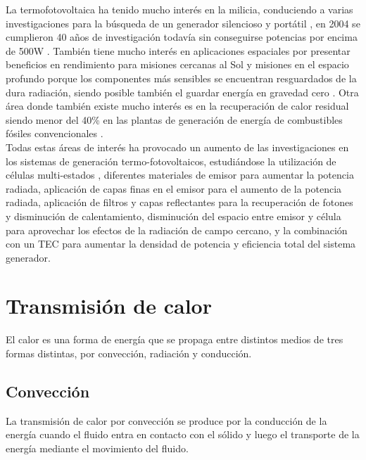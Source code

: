 La termofotovoltaica ha tenido mucho interés en la milicia, conduciendo a varias investigaciones para la búsqueda de un generador silencioso y portátil \cite{military_TPV}, en 2004 se cumplieron 40 años de investigación todavía sin conseguirse potencias por encima de 500W \cite{military_TPV_40Years}. También tiene mucho interés en aplicaciones espaciales por presentar beneficios en rendimiento para misiones cercanas al Sol y misiones en el espacio profundo porque los componentes más sensibles se encuentran resguardados de la dura radiación, siendo posible también el guardar energía en gravedad cero \cite{TPV_space_applications}. Otra área donde también existe mucho interés es en la recuperación de calor residual siendo menor del 40\% en las plantas de generación de energía de combustibles fósiles convencionales \cite{wasteHeat_TPV}.\\

Todas estas áreas de interés ha provocado un aumento de las investigaciones en los sistemas de generación termo-fotovoltaicos, estudiándose la utilización de células multi-estados \cite{MultiEstados_Capas_TPVs}, diferentes materiales de emisor para aumentar la potencia radiada, aplicación de capas finas en el emisor para el aumento de la potencia radiada\cite{doi:Near_field_ThinFilm}, aplicación de filtros \cite{multiLayerFilters} y capas reflectantes para la recuperación de fotones y disminución de calentamiento\cite{Thermoionic_nTPV_DATAS201910}, disminución del espacio entre emisor y célula para aprovechar los efectos de la radiación de campo cercano\cite{thermoionic_TPV_NF,modelEfficiency_NF_TPV,nf_TPV_Pillars_SiO2,NearField_200nm}, y la combinación con un TEC para aumentar la densidad de potencia y eficiencia total del sistema generador\cite{thermoionic_TPV_NF,progress_Thermoionic_TPV,Thermoionic_nTPV_DATAS201910}.\\



\section{Transmisión de calor}
El calor es una forma de energía que se propaga entre distintos medios de tres formas distintas, por convección, radiación y conducción.
\subsection{Convección}
La transmisión de calor por convección se produce por la conducción de la energía cuando el fluido entra en contacto con el sólido y luego el transporte de la energía mediante el movimiento del fluido.
